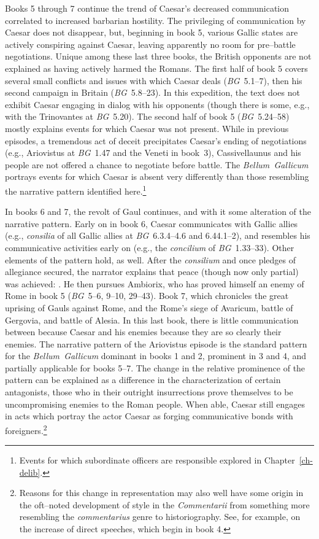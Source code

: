\documentclass[12pt,letterpaper,oneside,final]{memoir}
\begin{document}
Books 5 through 7 continue the trend of Caesar's decreased communication correlated to increased barbarian hostility. The privileging of communication by Caesar does not disappear, but, beginning in book 5, various Gallic states are actively conspiring against Caesar, leaving apparently no room for pre--battle negotiations. Unique among these last three books, the British opponents are not explained as having actively harmed the Romans. The first half of book 5 covers several small conflicts and issues with which Caesar deals (\emph{BG}~5.1--7), then his second campaign in Britain (\emph{BG}~5.8--23). In this expedition, the text does not exhibit Caesar engaging in dialog with his opponents (though there is some, e.g., with the Trinovantes at \emph{BG}~5.20). The second half of book 5 (\emph{BG}~5.24--58) mostly explains events for which Caesar was not present. While in previous episodes, a tremendous act of deceit precipitates Caesar's ending of negotiations (e.g., Ariovistus at \emph{BG}~1.47 and the Veneti in book~3), Cassivellaunus and his people are not offered a chance to negotiate before battle. The \emph{Bellum~Gallicum} portrays events for which Caesar is absent very differently than those resembling the narrative pattern identified here.\footnote{Events for which subordinate officers are responsible explored in Chapter~\ref{ch-delib}.}

In books 6 and 7, the revolt of Gaul continues, and with it some alteration of the narrative pattern. Early on in book 6, Caesar communicates with Gallic allies (e.g., \emph{consilia} of all Gallic allies at \emph{BG}~6.3.4--4.6 and 6.44.1--2), and resembles his communicative activities early on (e.g., the \emph{concilium} of \emph{BG}~1.33--33). Other elements of the pattern hold, as well. After the \emph{consilium} and once pledges of allegiance secured, the narrator explains that peace (though now only partial) was achieved: . He then pursues Ambiorix, who has proved himself an enemy of Rome in book 5 (\emph{BG}~5--6, 9--10, 29--43). Book 7, which chronicles the great uprising of Gauls against Rome, and the Rome's siege of Avaricum, battle of Gergovia, and battle of Alesia. In this last book, there is little communication between because Caesar and his enemies because they are so clearly their enemies. The narrative pattern of the Ariovistus episode is the standard pattern for the \emph{Bellum~Gallicum} dominant in books 1 and 2, prominent in 3 and 4, and partially applicable for books 5--7. The change in the relative prominence of the pattern can be explained as a difference in the characterization of certain antagonists, those who in their outright insurrections prove themselves to be uncompromising enemies to the Roman people. When able, Caesar still engages in acts which portray the actor Caesar as forging communicative bonds with foreigners.\footnote{Reasons for this change in representation may also well have some origin in the oft--noted development of style in the \emph{Commentarii} from something more resembling the \emph{commentarius} genre to historiography. See, for example, \textcite[142]{riggsby2006} on the increase of direct speeches, which begin in book 4.}
\end{document}
